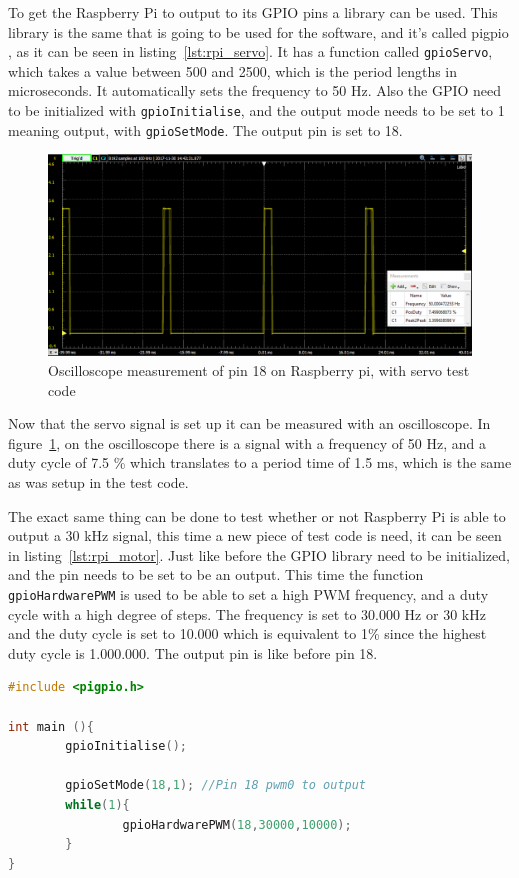 To get the Raspberry Pi to output to its GPIO pins a library can be used. This library is the same that is going to be used for the software, and it's called pigpio \cite{pigpio}, as it can be seen in listing~\ref{lst:rpi_servo}. It has a function called \texttt{gpioServo}, which takes a value between 500 and 2500, which is the period lengths in microseconds. It automatically sets the frequency to 50 Hz. Also the GPIO need to be initialized with \texttt{gpioInitialise}, and the output mode needs to be set to 1 meaning output, with \texttt{gpioSetMode}. The output pin is set to 18. 

\begin{figure}[H]
\centering
\includegraphics[width=0.7\linewidth]{Images/Implementation/RPI_servo_PWM}
\caption{Oscilloscope measurement of pin 18 on Raspberry pi, with servo test code}
\label{fig:rpi_servo_pwm}
\end{figure}

Now that the servo signal is set up it can be measured with an oscilloscope. In figure~\ref{fig:rpi_servo_pwm}, on the oscilloscope there is a signal with a frequency of 50 Hz, and a duty cycle of 7.5 \% which translates to a period time of 1.5 ms, which is the same as was setup in the test code.

The exact same thing can be done to test whether or not Raspberry Pi is able to output a 30 kHz signal, this time a new piece of test code is need, it can be seen in listing~\ref{lst:rpi_motor}. Just like before the GPIO library need to be initialized, and the pin needs to be set to be an output. This time the function \texttt{gpioHardwarePWM} is used to be able to set a high PWM frequency, and a duty cycle with a high degree of steps. The frequency is set to 30.000 Hz or 30 kHz and the duty cycle is set to 10.000 which is equivalent to 1\% since the highest duty cycle is 1.000.000. The output pin is like before pin 18.

\begin{lstlisting}[caption = {Test code to make the Raspberry pi run a motor a 30kHz}, captionpos=b, label={lst:rpi_motor}, 
language=C++,firstnumber=1]
#include <pigpio.h>

int main (){
        gpioInitialise();

        gpioSetMode(18,1); //Pin 18 pwm0 to output
        while(1){
                gpioHardwarePWM(18,30000,10000);
        }
}
\end{lstlisting}

